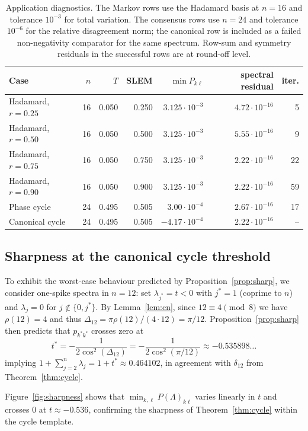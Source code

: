 \documentclass[12pt,fleqn]{amsart}
\theoremstyle{definition}
\theoremstyle{remark}
\newcommand{\1}{\mathbf{1}}
\begin{document}
\begin{table}[t]
\centering
\caption{Application diagnostics.  The Markov rows use the Hadamard basis at $n=16$ and tolerance $10^{-3}$ for total variation.  The consensus rows use $n=24$ and tolerance $10^{-6}$ for the relative disagreement norm; the canonical row is included as a failed non-negativity comparator for the same spectrum.  Row-sum and symmetry residuals in the successful rows are at round-off level.}
\label{tab:application_diagnostics}
\begin{tabular}{lrrrrrr}
\toprule
Case & $n$ & $T$ & SLEM & $\min P_{k\ell}$ & spectral residual & iter. \\
\midrule
Hadamard, $r=0.25$ & 16 & 0.050 & 0.250 & $3.125\cdot10^{-3}$ & $4.72\cdot10^{-16}$ & 5 \\
Hadamard, $r=0.50$ & 16 & 0.050 & 0.500 & $3.125\cdot10^{-3}$ & $5.55\cdot10^{-16}$ & 9 \\
Hadamard, $r=0.75$ & 16 & 0.050 & 0.750 & $3.125\cdot10^{-3}$ & $2.22\cdot10^{-16}$ & 22 \\
Hadamard, $r=0.90$ & 16 & 0.050 & 0.900 & $3.125\cdot10^{-3}$ & $2.22\cdot10^{-16}$ & 59 \\
Phase cycle & 24 & 0.495 & 0.505 & $3.00\cdot10^{-4}$ & $2.67\cdot10^{-16}$ & 17 \\
Canonical cycle & 24 & 0.495 & 0.505 & $-4.17\cdot10^{-4}$ & $2.22\cdot10^{-16}$ & -- \\
\bottomrule
\end{tabular}
\end{table}

\clearpage
\subsection{Sharpness at the canonical cycle threshold}
To exhibit the worst-case behaviour predicted by Proposition~\ref{prop:sharp}, we consider one-spike spectra in $n=12$: set $\lambda_{j^\ast}=t<0$ with $j^\ast=1$ (coprime to $n$) and $\lambda_j=0$ for $j\notin\{0,j^\ast\}$. By Lemma~\ref{lem:cn}, since $12\equiv4\pmod8$ we have $\rho(12)=4$ and thus $\Delta_{12}=\pi\rho(12)/(4\cdot 12)=\pi/12$. Proposition~\ref{prop:sharp} then predicts that $p_{k^\ast k^\ast}$ crosses zero at
\[
t^\ast=-\frac{1}{2\cos^2(\Delta_{12})}=-\frac{1}{2\cos^2(\pi/12)}\approx -0.535898\ldots
\]
implying $1+\sum_{j=2}^n\lambda_j=1+t^\ast\approx 0.464102$, in agreement with $\delta_{12}$ from Theorem~\ref{thm:cycle}.

Figure~\ref{fig:sharpness} shows that $\min_{k,\ell}P(\Lambda)_{k\ell}$ varies linearly in $t$ and crosses $0$ at $t\approx-0.536$, confirming the sharpness of Theorem~\ref{thm:cycle} within the cycle template.
\end{document}
